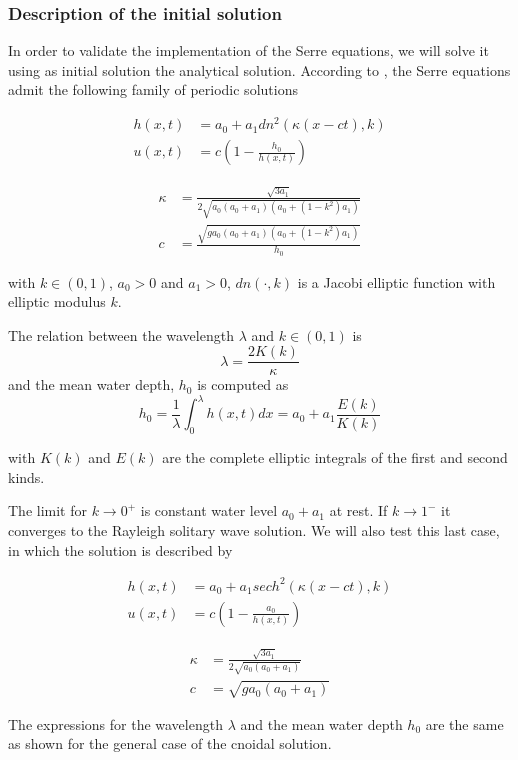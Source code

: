 \subsubsection{Description of the initial solution}

\indent In order to validate the implementation of the Serre equations, we will solve it using as initial solution the analytical solution. According to \cite{CarterCienfuegos2011}, the Serre equations admit the following family of periodic solutions

\begin{align*}
    h(x,t) &= a_0 + a_1 dn^2(\kappa(x-ct),k) \\
    u(x,t) &= c\left( 1 - \frac{h_0}{h(x,t)}\right)
\end{align*}

\begin{align*}
    \kappa &= \frac{\sqrt{3a_1}}{2\sqrt{a_0(a_0+a_1)(a_0+(1-k^2)a_1)}} \\
    c &= \frac{\sqrt{g a_0(a_0+a_1)(a_0+(1-k^2)a_1)}}{h_0}
\end{align*}

\noindent with $k\in(0,1)$, $a_0>0$ and $a_1>0$, $dn(\cdot,k)$ is a Jacobi elliptic function with elliptic modulus $k$.

\indent The relation between the wavelength $\lambda$ and $k\in(0,1)$ is $$\lambda = \frac{2K(k)}{\kappa}$$ and the mean water depth, $h_0$ is computed as $$h_0 = \frac{1}{\lambda}\int_{0}^\lambda h(x,t)dx = a_0 + a_1 \frac{E(k)}{K(k)}$$

\noindent with $K(k)$ and $E(k)$ are the complete elliptic integrals of the first and second kinds.

\indent The limit for $k\to0^+$ is constant water level $a_0+a_1$ at rest. If $k\to1^-$ it converges to the Rayleigh solitary wave solution. We will also test this last case, in which the solution is described by

\begin{align*}
    h(x,t) &= a_0 + a_1 sech^2(\kappa(x-ct),k) \\
    u(x,t) &= c\left( 1 - \frac{a_0}{h(x,t)}\right)
\end{align*}

\begin{align*}
    \kappa &= \frac{\sqrt{3a_1}}{2\sqrt{a_0(a_0+a_1)}} \\
    c &= \sqrt{g a_0(a_0+a_1)}
\end{align*}

\indent The expressions for the wavelength $\lambda$ and the mean water depth $h_0$ are the same as shown for the general case of the cnoidal solution.

